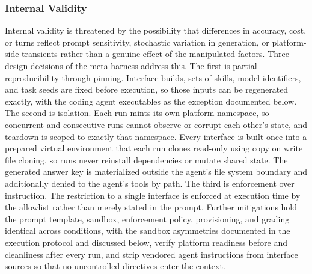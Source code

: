 \documentclass[
english,                 %
bibtex,                  %
]{kththesis}
\numberwithin{listing}{chapter}
\begin{document}
\subsubsection{Internal Validity}
\label{sec:method_internal_validity}

Internal validity is threatened by the possibility that differences in accuracy, cost, or turns reflect prompt sensitivity, stochastic variation in generation, or platform-side transients rather than a genuine effect of the manipulated factors. Three design decisions of the meta-harness address this. The first is partial reproducibility through pinning. Interface builds, sets of skills, model identifiers, and task seeds are fixed before execution, so those inputs can be regenerated exactly, with the coding agent executables as the exception documented below. The second is isolation. Each run mints its own platform namespace, so concurrent and consecutive runs cannot observe or corrupt each other's state, and teardown is scoped to exactly that namespace. Every interface is built once into a prepared virtual environment that each run clones read-only using copy on write file cloning, so runs never reinstall dependencies or mutate shared state. The generated answer key is materialized outside the agent's file system boundary and additionally denied to the agent's tools by path. The third is enforcement over instruction. The restriction to a single interface is enforced at execution time by the allowlist rather than merely stated in the prompt. Further mitigations hold the prompt template, sandbox, enforcement policy, provisioning, and grading identical across conditions, with the sandbox asymmetries documented in the execution protocol and discussed below, verify platform readiness before and cleanliness after every run, and strip vendored agent instructions from interface sources so that no uncontrolled directives enter the context.
\end{document}
